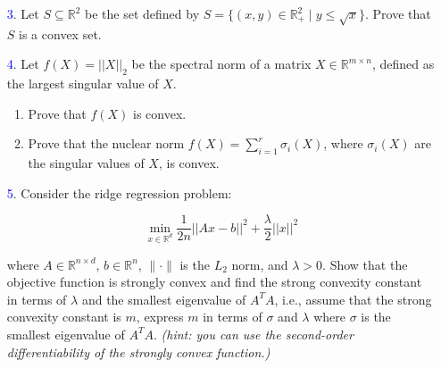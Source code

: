 \documentclass[10pt]{article}
\begin{document}
\begin{itemize}
	\vspace{1cm}
	
	\item[\textcolor{blue}{3}.] 
        Let $S \subseteq \mathbb{R}^2$ be the set defined by $S = \{(x, y) \in \mathbb{R}_+^2 \mid y \leq \sqrt{x}\}$. Prove that $S$ is a convex set. 
	\vspace{1cm}
	
	\item[\textcolor{blue}{4}.]
        Let $f(X) = ||X||_2$ be the spectral norm of a matrix $X \in \mathbb{R}^{m \times n}$, defined as the largest singular value of $X$.
	  \begin{enumerate}
	  \item Prove that $f(X)$ is convex. 
	
	  \item Prove that the nuclear norm $f(X) = \sum_{i=1}^{r} \sigma_i(X)$, where $\sigma_i(X)$ are the singular values of $X$, is convex. 
	   \end{enumerate}
	\vspace{1cm}

	\item[\textcolor{blue}{5}.]
       Consider the ridge regression problem:

	$$\min_{x \in \mathbb{R}^d} \frac{1}{2n} ||Ax - b||^2 + \frac{\lambda}{2} ||x||^2$$
	
	where $A \in \mathbb{R}^{n \times d}$, $b \in \mathbb{R}^n$, $\|\cdot\|$ is the $L_2$ norm, and $\lambda > 0$. Show that the objective function is strongly convex  and find the strong convexity constant in terms of $\lambda$ and the smallest eigenvalue of $A^T A$, i.e., assume that the strong convexity constant is $m$, express $m$ in terms of $\sigma$ and $\lambda$ where $\sigma$ is the smallest eigenvalue of $A^T A$. \emph{(hint: you can use the second-order differentiability of the strongly convex function.)} 
	\vspace{1cm}
	    
\end{itemize}
	
\end{document}
